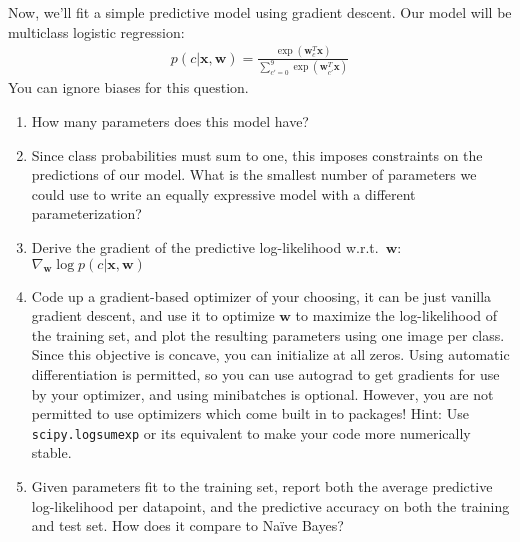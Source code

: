 \documentclass{harvardml}
\newcommand{\bx}{\mathbf{x}}
\newcommand{\bw}{\mathbf{w}}
\theoremstyle{plain}
\begin{document}
\begin{problem}

Now, we'll fit a simple predictive model using gradient descent.  Our model will be multiclass logistic regression:
\begin{align}
p(c | \bx, \bw) = \frac{\exp(\bw_c^T \bx)}{\sum_{c' = 0}^9 \exp(\bw_{c'}^T \bx)}
\end{align}
You can ignore biases for this question.
\begin{enumerate}[label=(\alph*)]
\item How many parameters does this model have?
\item Since class probabilities must sum to one, this imposes constraints on the predictions of our model.  What is the smallest number of parameters we could use to write an equally expressive model with a different parameterization?
\item Derive the gradient of the predictive log-likelihood w.r.t.\ $\bw$: $\nabla_{\bw} \log p(c | \bx, \bw)$
\item Code up a gradient-based optimizer of your choosing, it can be just vanilla gradient descent, and use it to optimize $\bw$ to maximize the log-likelihood of the training set, and plot the resulting parameters using one image per class.  Since this objective is concave, you can initialize at all zeros.  Using automatic differentiation is permitted, so you can use autograd to get gradients for use by your optimizer, and using minibatches is optional. However, you are not permitted to use optimizers which come built in to packages! Hint: Use \texttt{scipy.logsumexp} or its equivalent to make your code more numerically stable.
\item Given parameters fit to the training set, report both the average predictive log-likelihood per datapoint, and the predictive accuracy on both the training and test set.  How does it compare to Na\"ive Bayes?
\end{enumerate}
\end{problem}



\end{document}
